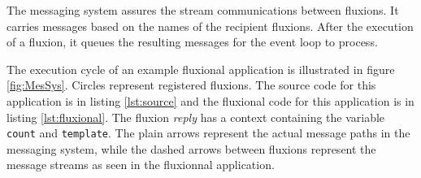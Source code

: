
The messaging system assures the stream communications between fluxions.
It carries messages based on the names of the recipient fluxions.
After the execution of a fluxion, it queues the resulting messages for the event loop to process.







The execution cycle of an example fluxional application is illustrated in figure \ref{fig:MesSys}.
Circles represent registered fluxions.
The source code for this application is in listing \ref{lst:source} and the fluxional code for this application is in listing \ref{lst:fluxional}.
The fluxion \textit{reply} has a context containing the variable \texttt{count} and \texttt{template}.
The plain arrows represent the actual message paths in the messaging system, while the dashed arrows between fluxions represent the message streams as seen in the fluxionnal application.

